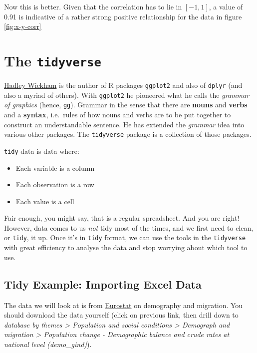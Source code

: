\documentclass[]{book}
\providecommand{\tightlist}{%
  \setlength{\itemsep}{0pt}\setlength{\parskip}{0pt}}
\theoremstyle{definition}
\theoremstyle{definition}
\theoremstyle{definition}
\theoremstyle{remark}
\begin{document}
Now this is better. Given that the correlation has to lie in \([-1,1]\),
a value of 0.91 is indicative of a rather strong positive relationship
for the data in figure \ref{fig:x-y-corr}

\section{\texorpdfstring{The
\texttt{tidyverse}}{The tidyverse}}\label{the-tidyverse}

\href{http://hadley.nz}{Hadley Wickham} is the author of R packages
\texttt{ggplot2} and also of \texttt{dplyr} (and also a myriad of
others). With \texttt{ggplot2} he pioneered what he calls the
\emph{grammar of graphics} (hence, \texttt{gg}). Grammar in the sense
that there are \textbf{nouns} and \textbf{verbs} and a \textbf{syntax},
i.e.~rules of how nouns and verbs are to be put together to construct an
understandable sentence. He has extended the \emph{grammar} idea into
various other packages. The \texttt{tidyverse} package is a collection
of those packages.

\texttt{tidy} data is data where:

\begin{itemize}
\tightlist
\item
  Each variable is a column
\item
  Each observation is a row
\item
  Each value is a cell
\end{itemize}

Fair enough, you might say, that is a regular spreadsheet. And you are
right! However, data comes to us \emph{not} tidy most of the times, and
we first need to clean, or \texttt{tidy}, it up. Once it's in
\texttt{tidy} format, we can use the tools in the \texttt{tidyverse}
with great efficiency to analyse the data and stop worrying about which
tool to use.

\subsection{Tidy Example: Importing Excel
Data}\label{tidy-example-importing-excel-data}

The data we will look at is from
\href{http://ec.europa.eu/eurostat/data/database}{Eurostat} on
demography and migration. You should download the data yourself (click
on previous link, then drill down to \emph{database by themes
\textgreater{} Population and social conditions \textgreater{} Demograph
and migration \textgreater{} Population change - Demographic balance and
crude rates at national level (demo\_gind)}).
\end{document}
